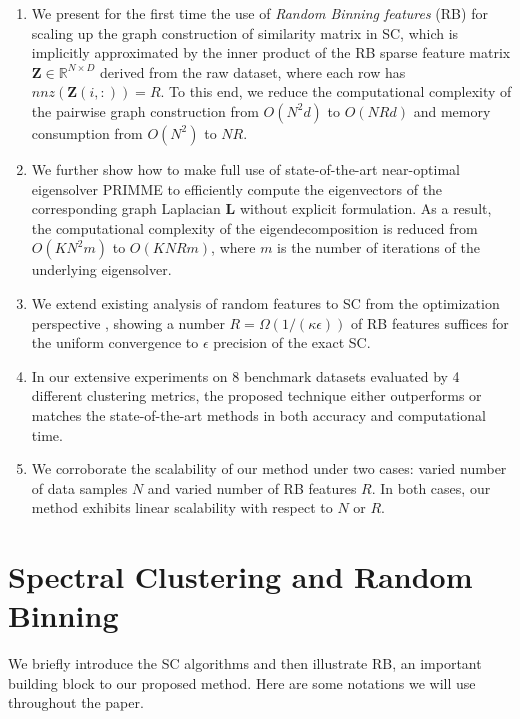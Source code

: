 \documentclass[sigconf]{acmart}
\newcommand{\R}{\mathbb{R}}
\newcommand{\1}{\boldsymbol{1}}
\newcommand{\bL}{\mathbf{L}}
\newcommand{\bZ}{\mathbf{Z}}
\newcommand{\0}{\boldsymbol{0}}
\begin{document}
\begin{enumerate}
\item  We present for the first time the use of \emph{Random Binning features} (RB) \cite{rahimi2008random,wu2016revisiting} for scaling up the graph construction of similarity matrix in SC, which is implicitly approximated by the inner product of the RB sparse feature matrix $\bZ \in \R^{N \times D}$ derived from the raw dataset, where each row has $nnz(\bZ(i,:)) = R$. To this end, we reduce the computational complexity of the pairwise graph construction from $O(N^2d)$ to $O(NRd)$ and memory consumption from $O(N^2)$ to $NR$. 

\item We further show how to make full use of state-of-the-art near-optimal eigensolver PRIMME \cite{stathopoulos2010primme,wu2017primme_svds} to  efficiently compute the eigenvectors of the corresponding graph Laplacian $\bL$ without explicit formulation. As a result, the computational complexity of the eigendecomposition is reduced from $O(KN^2m)$ to $O(KNRm)$, where $m$ is the number of iterations of the underlying eigensolver.  

\item We extend existing analysis of random features to SC from the optimization perspective \cite{wu2016revisiting}, showing a number {$R = \Omega(1/(\kappa \epsilon))$} of RB features suffices for the uniform convergence to $\epsilon$ precision of the exact SC.

\item In our extensive experiments on 8 benchmark datasets evaluated by 4 different clustering metrics, the proposed technique either outperforms or matches the state-of-the-art methods in both accuracy and computational time. 

\item We corroborate the scalability of our method under two cases: varied number of data samples $N$ and varied number of RB features $R$. In both cases, our method exhibits linear scalability with respect to $N$ or $R$.

\end{enumerate}




\section{Spectral Clustering and Random Binning}
We briefly introduce the SC algorithms and then illustrate RB, an important building block to our proposed method. Here are some notations we will use throughout the paper.
\end{document}
